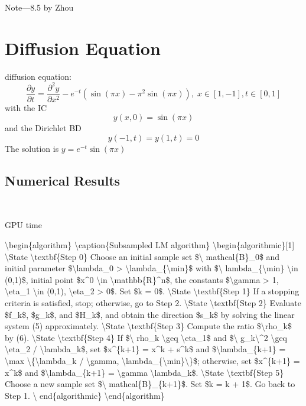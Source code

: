 \documentclass{article}
\newcommand{\tmtextbf}[1]{\text{{\bfseries{#1}}}}
\begin{document}
Note---8.5 by Zhou

\section{Diffusion Equation }

diffusion equation:
\[ \frac{\partial y}{\partial t} = \frac{\partial^2 y}{\partial x^2} - e^{-
   t} (\sin (\pi x) - \pi^2 \sin (\pi x)), \; x \in [1, - 1], t \in [0, 1] \]
with the IC
\[ y (x, 0) = \sin (\pi x) \]
and the Dirichlet BD
\[ y (- 1, t) = y (1, t) = 0 \]
The solution is $y = e^{- t} \sin (\pi x)$

\subsection{Numerical Results}

\

{}

\tmtextbf{Settings: }

GPU time

\textbackslash begin\{algorithm\} \textbackslash caption\{Subsampled LM
algorithm\} \textbackslash begin\{algorithmic\}[1] \textbackslash State
\textbackslash textbf\{Step 0\} Choose an initial sample set \$\textbackslash
mathcal\{B\}\_0\$ and initial parameter \$\textbackslash lambda\_0 >
\textbackslash lambda\_\{\textbackslash min\}\$ with \$\textbackslash
lambda\_\{\textbackslash min\} \textbackslash in (0,1)\$, initial point
\$x\^{}0 \textbackslash in \textbackslash mathbb\{R\}\^{}n\$, the constants
\$\textbackslash gamma > 1, \textbackslash eta\_1 \textbackslash in (0,1),
\textbackslash eta\_2 > 0\$. Set \$k = 0\$. \textbackslash State
\textbackslash textbf\{Step 1\} If a stopping criteria is satisfied, stop;
otherwise, go to Step 2. \textbackslash State \textbackslash textbf\{Step 2\}
Evaluate \$f\_k\$, \$g\_k\$, and \$H\_k\$, and obtain the direction \$s\_k\$
by solving the linear system (5) approximately. \textbackslash State
\textbackslash textbf\{Step 3\} Compute the ratio \$\textbackslash rho\_k\$ by
(6). \textbackslash State \textbackslash textbf\{Step 4\} If \$\textbackslash
rho\_k \textbackslash geq \textbackslash eta\_1\$ and \$\textbackslash\textbar
g\_k\textbackslash\textbar \^{}2 \textbackslash geq \textbackslash eta\_2 /
\textbackslash lambda\_k\$, set \$x\^{}\{k+1\} = x\^{}k + s\^{}k\$ and
\$\textbackslash lambda\_\{k+1\} = \textbackslash max
\textbackslash\{\textbackslash lambda\_k / \textbackslash gamma,
\textbackslash lambda\_\{\textbackslash min\}\textbackslash\}\$; otherwise,
set \$x\^{}\{k+1\} = x\^{}k\$ and \$\textbackslash lambda\_\{k+1\} =
\textbackslash gamma \textbackslash lambda\_k\$. \textbackslash State
\textbackslash textbf\{Step 5\} Choose a new sample set \$\textbackslash
mathcal\{B\}\_\{k+1\}\$. Set \$k = k + 1\$. Go back to Step 1. \textbackslash
end\{algorithmic\} \textbackslash end\{algorithm\}
\end{document}
